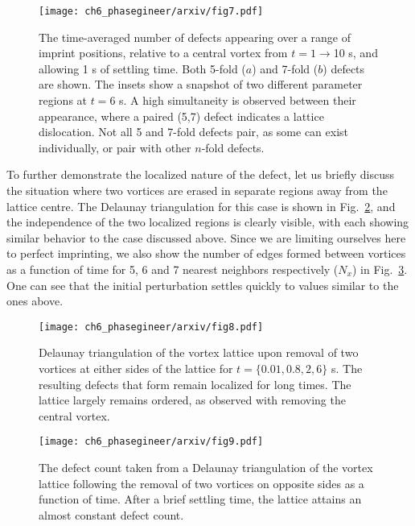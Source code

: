 \begin{figure}[h!]\centering
    \texttt{[image: ch6\_phasegineer/arxiv/fig7.pdf]}
    \caption{The time-averaged number of defects appearing over a range of imprint positions, relative to a central vortex from $t=1\rightarrow$10 s, and allowing 1 s of settling time. Both 5-fold ($a$) and 7-fold ($b$) defects are shown. The insets show a snapshot of two different parameter regions at $t=6$ s. A high simultaneity is observed between their appearance, where a paired (5,7) defect indicates a lattice dislocation. Not all 5 and 7-fold defects pair, as some can exist individually, or pair with other $n$-fold defects.} \label{fig:lattice_misalign}
\end{figure}

To further demonstrate the localized nature of the defect, let us briefly discuss the situation where two vortices are erased in separate regions away from the lattice centre. The Delaunay triangulation for this case is shown in Fig.~\ref{fig:traj_2vtx_edge}, and the independence of the two localized regions is clearly visible, with each  showing similar behavior to the case discussed above. Since we are limiting ourselves here to perfect imprinting, we also show the number of edges formed between vortices as a function of time for 5, 6 and 7 nearest neighbors respectively ($N_x$) in Fig.~\ref{fig:vtx_rem2_edge}. One can see that the initial perturbation settles quickly to values similar to the ones above.

\begin{figure}[h!]\centering
    \texttt{[image: ch6\_phasegineer/arxiv/fig8.pdf]}
    \caption{Delaunay triangulation of the vortex lattice upon removal of two vortices at either sides of the lattice for $t=\{0.01,0.8,2,6\}$ s. The resulting defects that form remain localized for long times. The lattice largely remains ordered, as observed with removing the central vortex.}\label{fig:traj_2vtx_edge}
\end{figure}

\begin{figure}[h!]\centering
    \texttt{[image: ch6\_phasegineer/arxiv/fig9.pdf]}
    \caption{The defect count taken from a Delaunay triangulation of the vortex lattice following the removal of two vortices on opposite sides as a function of time. After a brief settling time, the lattice attains an almost constant defect count.}\label{fig:remove7_defect}
    \label{fig:vtx_rem2_edge}
\end{figure}

